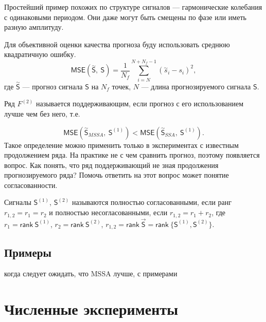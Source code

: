 \documentclass[specialist, substylefile = spbureport.rtx,
    subf,href,colorlinks=true, 12pt]{disser}
\newtheorem*{example}{Пример}
\newcommand{\rank}{\mathsf{rank}\ }
\newcommand{\sfS}{\mathsf{S}}
\newcommand{\MS}{\vec{\sfS}}
\newcommand{\MSE}{\mathsf{MSE}}
\begin{document}
        Простейший пример похожих по структуре сигналов --- гармонические колебания с одинаковыми периодом. Они даже могут быть смещены по фазе или иметь разную амплитуду.

        Для объективной оценки качества прогноза буду использовать среднюю квадратичную ошибку.
        $$\mathsf{MSE(\overset{\sim}{S},\ S)} = \frac{1}{N_{f}} \sum_{i = N}^{N + N_{f} - 1} (\overset{\sim}{s}_i - s_i)^2,$$
        где $\overset{\sim}{\sfS}$ --- прогноз сигнала $\sfS$ на $N_{f}$ точек, $N$ --- длина прогнозируемого сигнала $\sfS$.
    

        Ряд $F^{(2)}$ называется поддерживающим, если прогноз с его использованием лучше чем без него, т.е.
    
        $$\MSE(\overset{\sim}{\sfS}_{MSSA},\ \sfS^{(1)}) < \MSE(\overset{\sim}{\sfS}_{SSA},\ \sfS^{(1)}).$$
        Такое определение можно применить только в экспериментах с известным продолжением ряда. На практике не с чем сравнить прогноз, поэтому появляется вопрос. Как понять, что ряд поддерживающий не зная продолжения прогнозируемого ряда? Помочь ответить на этот вопрос может понятие согласованности.

        Сигналы $\sfS^{(1)}$, $\sfS^{(2)}$ называются полностью согласованными, если ранг $r_{1,2} = r_1 = r_2$ и полностью несогласованными, если $r_{1,2} = r_1 + r_2$, где $r_1 = \rank \sfS^{(1)}$, $r_2 = \rank \sfS^{(2)}$, $r_{1,2} = \rank \MS = \rank \{\sfS^{(1)}, \sfS^{(2)}\}.$

    \section{Примеры}
        когда следует ожидать, что MSSA лучше, с примерами


    \chapter{Численные эксперименты}
        
\end{document}
